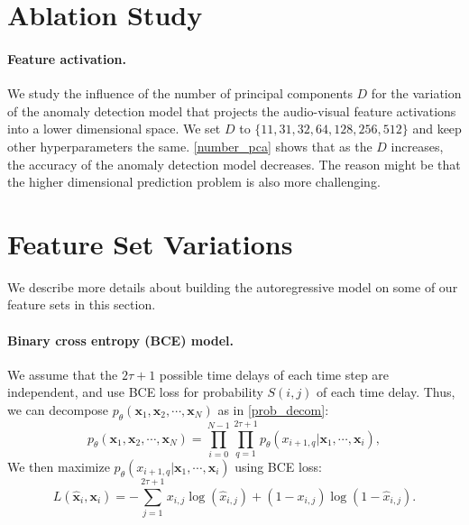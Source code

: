 \documentclass[10pt,twocolumn,letterpaper]{article}
\newcommand{\bx}[0]{{\mathbf x}}
\newcommand{\mypar}[1]{\vspace{-3mm}\paragraph{#1}}
\begin{document}
\section{Ablation Study}
\paragraph{Feature activation. }
We study the influence of the number of principal components $D$ for the variation of the anomaly detection model that projects the audio-visual feature activations into a lower dimensional space. We set $D$ to $\{11, 31, 32, 64, 128, 256, 512\}$ and keep other hyperparameters the same. \cref{number_pca} shows that as the $D$ increases, the accuracy of the anomaly detection model decreases. The reason might be that the higher dimensional prediction problem is also more challenging. 




\section{Feature Set Variations}
\label{appendix:feature_set}
We describe more details about building the autoregressive model on some of our feature sets in this section.

\mypar{Binary cross entropy (BCE) model.} 
We assume that the $2\tau+1$ possible time delays of each time step are independent, and use BCE loss for probability $S(i,j)$ of each time delay.  
Thus, we can decompose $ p_{\theta}(\mathbf{x}_{1}, \mathbf{x}_{2}, \cdots, \mathbf{x}_{N})$ as in \cref{prob_decom}:
\begin{equation}\label{prob_decom}
p_{\theta}(\mathbf{x}_{1}, \mathbf{x}_{2}, \cdots , \mathbf{x}_{N}) = 
\prod_{i=0}^{N-1}\prod_{q=1}^{2\tau + 1}p_{\theta}\left(x_{i+1, q}|\mathbf{x}_{1},
\cdots,\mathbf{x}_{i}\right),
\end{equation}
We then maximize $p_{\theta}\left(x_{i+1, q}|\mathbf{x}_{1},\cdots,\mathbf{x}_{i}\right)$ using BCE loss:
\begin{equation}\label{bce}
    L(\hat \bx_i, \bx_i) = - \sum_{j=1}^{2\tau+1} x_{i,j} \log(\hat x_{i,j}) + (1-x_{i,j})\log(1 - \hat{x}_{i,j}).
\end{equation}
\end{document}
